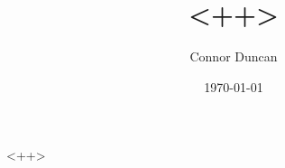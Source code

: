 \documentclass{article}
\author{Connor Duncan}
\date{\today}
\title{<++>}
\theoremstyle{definition}
\begin{document}
\maketitle
\tableofcontents
<++>
\end{document}
